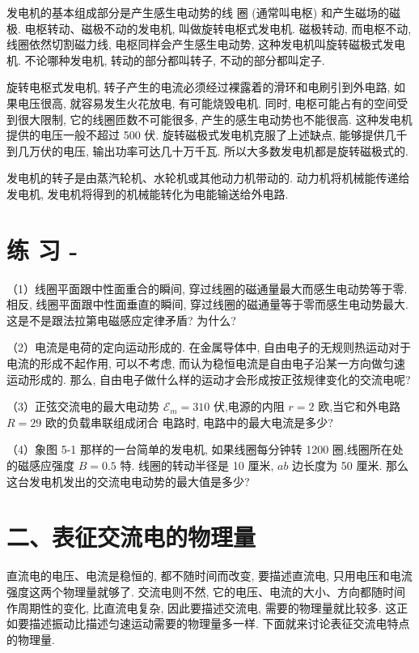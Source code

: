 \documentclass[10pt]{article}
\begin{document}
发电机的基本组成部分是产生感生电动势的线 圈 (通常叫电枢) 和产生磁场的磁极. 电枢转动、磁极不动的发电机, 叫做旋转电枢式发电机. 磁极转动, 而电枢不动, 线圈依然切割磁力线, 电枢同样会产生感生电动势, 这种发电机叫旋转磁极式发电机. 不论哪种发电机, 转动的部分都叫转子, 不动的部分都叫定子.

旋转电枢式发电机, 转子产生的电流必须经过裸露着的滑环和电刷引到外电路, 如果电压很高, 就容易发生火花放电, 有可能烧毁电机. 同时, 电枢可能占有的空间受到很大限制, 它的线圈匝数不可能很多, 产生的感生电动势也不能很高. 这种发电机提供的电压一般不超过 500 伏. 旋转磁极式发电机克服了上述缺点, 能够提供几千到几万伏的电压, 输出功率可达几十万千瓦. 所以大多数发电机都是旋转磁极式的.

发电机的转子是由蒸汽轮机、水轮机或其他动力机带动的. 动力机将机械能传递给发电机, 发电机将得到的机械能转化为电能输送给外电路.

\section*{练 习 -}

（1）线圈平面跟中性面重合的瞬间, 穿过线圈的磁通量最大而感生电动势等于零. 相反, 线圈平面跟中性面垂直的瞬间, 穿过线圈的磁通量等于零而感生电动势最大. 这是不是跟法拉第电磁感应定律矛盾? 为什么?

（2）电流是电荷的定向运动形成的. 在金属导体中, 自由电子的无规则热运动对于电流的形成不起作用, 可以不考虑, 而认为稳恒电流是自由电子沿某一方向做匀速运动形成的. 那么, 自由电子做什么样的运动才会形成按正弦规律变化的交流电呢?

（3）正弦交流电的最大电动势 \({\mathcal{E}}_{m} = {310}\) 伏,电源的内阻 \(r = 2\) 欧,当它和外电路 \(R = {29}\) 欧的负载串联组成闭合 电路时, 电路中的最大电流是多少?

（4）象图 5-1 那样的一台简单的发电机, 如果线圈每分钟转 1200 圈,线圈所在处的磁感应强度 \(B = {0.5}\) 特. 线圈的转动半径是 10 厘米, \({ab}\) 边长度为 50 厘米. 那么这台发电机发出的交流电电动势的最大值是多少?

\section*{二、表征交流电的物理量}

直流电的电压、电流是稳恒的, 都不随时间而改变, 要描述直流电, 只用电压和电流强度这两个物理量就够了. 交流电则不然, 它的电压、电流的大小、方向都随时间作周期性的变化, 比直流电复杂, 因此要描述交流电, 需要的物理量就比较多. 这正如要描述振动比描述匀速运动需要的物理量多一样. 下面就来讨论表征交流电特点的物理量.
\end{document}
